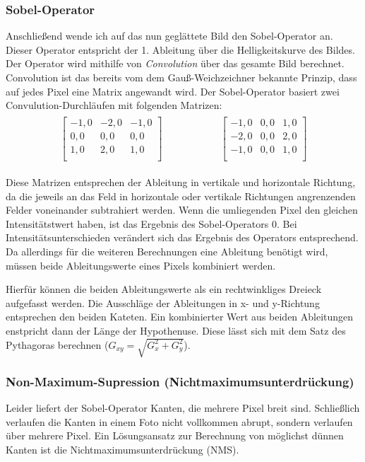 \subsubsection{Sobel-Operator}
Anschließend wende ich auf das nun geglättete Bild den Sobel-Operator an. Dieser Operator entspricht der 1. Ableitung über die Helligkeitskurve des Bildes. Der Operator wird mithilfe von \textit{Convolution} über das gesamte Bild berechnet. Convolution ist das bereits vom dem Gauß-Weichzeichner bekannte Prinzip, dass auf jedes Pixel eine Matrix angewandt wird. Der Sobel-Operator basiert zwei Convulution-Durchläufen mit folgenden Matrizen:
\begin{gather}
	\begin{split}
		\begin{bmatrix}
			-1,0&-2,0&-1,0\\
			0,0&0,0&0,0\\
			1,0&2,0&1,0\\
		\end{bmatrix}
	\end{split}
	\hspace{5em}
	\begin{split}
		\begin{bmatrix}
			-1,0&0,0&1,0\\
			-2,0&0,0&2,0\\
			-1,0&0,0&1,0\\
		\end{bmatrix}
	\end{split}
\end{gather}

Diese Matrizen entsprechen der Ableitung in vertikale und horizontale Richtung, da die jeweils an das Feld in horizontale oder vertikale Richtungen angrenzenden Felder voneinander subtrahiert werden.
Wenn die umliegenden Pixel den gleichen Intensitätstwert haben, ist das Ergebnis des Sobel-Operators 0.
Bei Intensitätsunterschieden verändert sich das Ergebnis des Operators entsprechend.
Da allerdings für die weiteren Berechnungen eine Ableitung benötigt wird, müssen beide Ableitungswerte eines Pixels kombiniert werden.

Hierfür können die beiden Ableitungswerte als ein rechtwinkliges Dreieck aufgefasst werden. Die Ausschläge der Ableitungen in x- und y-Richtung entsprechen den beiden Kateten. Ein kombinierter Wert aus beiden Ableitungen enstpricht dann der Länge der Hypothenuse. Diese lässt sich mit dem Satz des Pythagoras berechnen (\(G_{xy} = \sqrt{G_x^2 + G_y^2}\)).

\subsubsection{Non-Maximum-Supression (Nichtmaximumsunterdrückung)}
Leider liefert der Sobel-Operator Kanten, die mehrere Pixel breit sind. Schließlich verlaufen die Kanten in einem Foto nicht vollkommen abrupt, sondern verlaufen über mehrere Pixel. 
Ein Lösungsansatz zur Berechnung von möglichst dünnen Kanten ist die Nichtmaximumsunterdrückung (NMS). 


